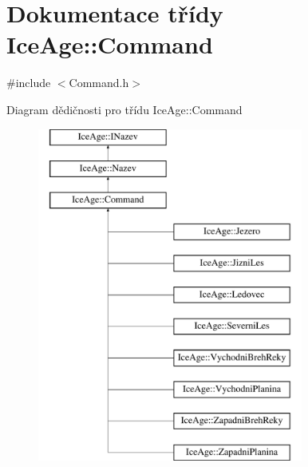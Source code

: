 \hypertarget{classIceAge_1_1Command}{}\section{Dokumentace třídy Ice\+Age\+:\+:Command}
\label{classIceAge_1_1Command}


{\ttfamily \#include $<$Command.\+h$>$}

Diagram dědičnosti pro třídu Ice\+Age\+:\+:Command\begin{figure}[H]
\begin{center}
\leavevmode
\includegraphics[height=11.000000cm]{d6/d36/classIceAge_1_1Command}
\end{center}
\end{figure}
